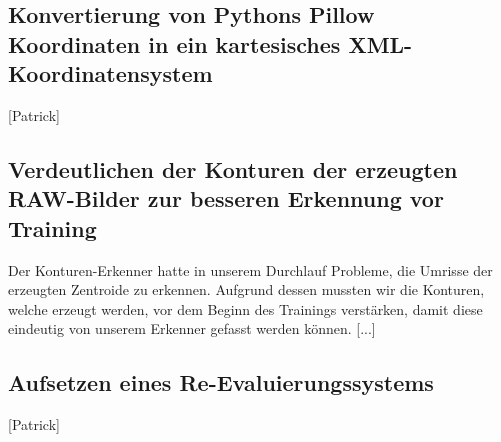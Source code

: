 \documentclass[11pt]{article}
\begin{document}
\subsection{Konvertierung von Pythons Pillow Koordinaten in ein kartesisches XML-Koordinatensystem}
[Patrick]
\subsection{Verdeutlichen der Konturen der erzeugten RAW-Bilder zur besseren Erkennung vor Training}
Der Konturen-Erkenner hatte in unserem Durchlauf Probleme, die Umrisse der erzeugten Zentroide zu erkennen. Aufgrund dessen mussten wir die Konturen, welche erzeugt werden, vor dem Beginn des Trainings verstärken, damit diese eindeutig von unserem Erkenner gefasst werden können. [...]
\subsection{Aufsetzen eines Re-Evaluierungssystems}
[Patrick]
\end{document}
